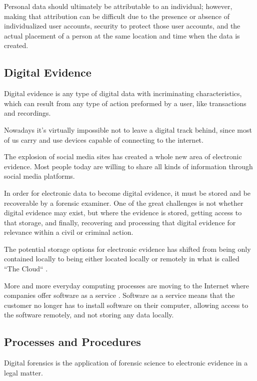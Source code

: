 Personal data should ultimately be attributable to an individual; however, making
that attribution can be difficult due to the presence or absence of individualized
user accounts, security to protect those user accounts, and the actual placement of a
person at the same location and time when the data is created.

\subsection{Digital Evidence}

Digital evidence is any type of digital data with incriminating characteristics,
which can result from any type of action preformed by a user, like transactions and
recordings.

Nowadays it's virtually impossible not to leave a digital track behind, since most
of us carry and use devices capable of connecting to the internet.

The explosion of social media sites has created a whole new area of electronic
evidence. Most people today are willing to share all kinds of information through
social media platforms.

In order for electronic data to become digital evidence, it must be stored and be recoverable
by a forensic examiner. One of the great challenges is not whether digital
evidence may exist, but where the evidence is stored, getting access to that storage,
and finally, recovering and processing that digital evidence for relevance within
a civil or criminal action.

The potential storage options for electronic evidence has shifted from being only contained locally
to being either located locally or remotely in what is called ``The Cloud`` \cite{cloud}. 

More and more everyday computing processes are moving to the Internet
where companies offer software as a service \cite{saas}. Software as a service means that
the customer no longer has to install software on their computer, allowing access to the software remotely,
and not storing any data locally.


\subsection{Processes and Procedures}

Digital forensics is the application of forensic science to electronic evidence in a
legal matter.

